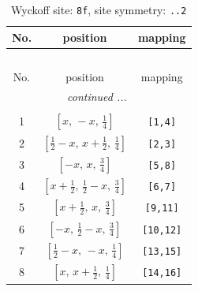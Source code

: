 \documentclass[fleqn,8pt]{jsarticle}
\begin{document}
\begin{longtable}{ccc}
\caption{Wyckoff site: {\tt 8f}, site symmetry: {\tt ..2}}
 \\
 \hline \hline
No. & position & mapping \\ \hline \endfirsthead

\multicolumn{2}{l}{\tablename\ \thetable{}} \\
 \hline \hline
No. & position & mapping \\ \hline \endhead

 \hline \hline
\multicolumn{2}{r}{\footnotesize\it continued ...} \\ \endfoot

 \hline \hline
\multicolumn{2}{r}{} \\ \endlastfoot

1 & $\left[ x,\, - x,\, \frac{1}{4} \right]$ & {\tt [1,4]} \\ \hline
2 & $\left[ \frac{1}{2} - x,\, x + \frac{1}{2},\, \frac{1}{4} \right]$ & {\tt [2,3]} \\ \hline
3 & $\left[ - x,\, x,\, \frac{3}{4} \right]$ & {\tt [5,8]} \\ \hline
4 & $\left[ x + \frac{1}{2},\, \frac{1}{2} - x,\, \frac{3}{4} \right]$ & {\tt [6,7]} \\ \hline
5 & $\left[ x + \frac{1}{2},\, x,\, \frac{3}{4} \right]$ & {\tt [9,11]} \\ \hline
6 & $\left[ - x,\, \frac{1}{2} - x,\, \frac{3}{4} \right]$ & {\tt [10,12]} \\ \hline
7 & $\left[ \frac{1}{2} - x,\, - x,\, \frac{1}{4} \right]$ & {\tt [13,15]} \\ \hline
8 & $\left[ x,\, x + \frac{1}{2},\, \frac{1}{4} \right]$ & {\tt [14,16]} \\
\end{longtable}
\renewcommand{\arraystretch}{1.2}
\end{document}
